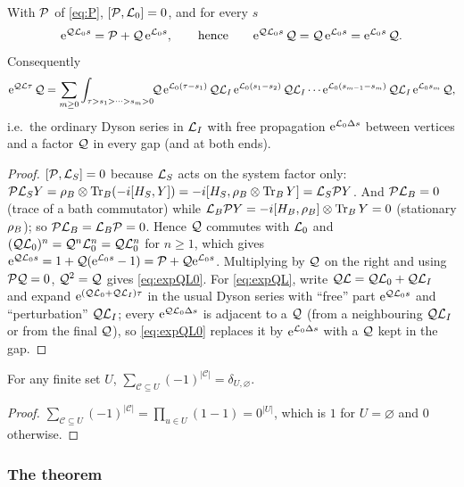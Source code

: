 \begin{lemma}\label{lem:expansion}
With $\mathcal{P}$ of \cref{eq:P}, $[\mathcal{P},\mathcal{L}_0]=0$, and for every $s$
\begin{equation}
  \mathrm{e}^{\mathcal{Q}\mathcal{L}_0s}=\mathcal{P}+\mathcal{Q}\,\mathrm{e}^{\mathcal{L}_0s},\qquad\text{hence}\qquad \mathrm{e}^{\mathcal{Q}\mathcal{L}_0s}\,\mathcal{Q}=\mathcal{Q}\,\mathrm{e}^{\mathcal{L}_0s}=\mathrm{e}^{\mathcal{L}_0s}\,\mathcal{Q} .
  \label{eq:expQL0}
\end{equation}
Consequently
\begin{equation}
  \mathrm{e}^{\mathcal{Q}\mathcal{L}\tau}\,\mathcal{Q}=\sum_{m\ge0}\int_{\tau>s_1>\dots>s_m>0}\!\!
  \mathcal{Q}\,\mathrm{e}^{\mathcal{L}_0(\tau-s_1)}\,\mathcal{Q}\mathcal{L}_I\,\mathrm{e}^{\mathcal{L}_0(s_1-s_2)}\,\mathcal{Q}\mathcal{L}_I\cdots\mathrm{e}^{\mathcal{L}_0(s_{m-1}-s_m)}\,\mathcal{Q}\mathcal{L}_I\,\mathrm{e}^{\mathcal{L}_0s_m}\,\mathcal{Q} ,
  \label{eq:expQL}
\end{equation}
i.e.\ the ordinary Dyson series in $\mathcal{L}_I$ with free propagation $\mathrm{e}^{\mathcal{L}_0\Delta s}$ between vertices and a factor $\mathcal{Q}$ in every gap (and at both ends).
\end{lemma}
\begin{proof}
$[\mathcal{P},\mathcal{L}_S]=0$ because $\mathcal{L}_S$ acts on the system factor only: $\mathcal{P}\mathcal{L}_SY=\rho_{B}\otimes\operatorname{Tr}_B(-i[H_S,Y])=-i[H_S,\rho_{B}\otimes\operatorname{Tr}_BY]=\mathcal{L}_S\mathcal{P} Y$.
And $\mathcal{P}\mathcal{L}_B=0$ (trace of a bath commutator) while $\mathcal{L}_B\mathcal{P} Y=-i[H_B,\rho_{B}]\otimes\operatorname{Tr}_BY=0$ (stationary $\rho_{B}$); so $\mathcal{P}\mathcal{L}_B=\mathcal{L}_B\mathcal{P}=0$.
Hence $\mathcal{Q}$ commutes with $\mathcal{L}_0$ and $(\mathcal{Q}\mathcal{L}_0)^n=\mathcal{Q}^n\mathcal{L}_0^n=\mathcal{Q}\mathcal{L}_0^n$ for $n\ge1$, which gives $\mathrm{e}^{\mathcal{Q}\mathcal{L}_0s}=1+\mathcal{Q}(\mathrm{e}^{\mathcal{L}_0s}-1)=\mathcal{P}+\mathcal{Q}\mathrm{e}^{\mathcal{L}_0s}$.
Multiplying by $\mathcal{Q}$ on the right and using $\mathcal{P}\mathcal{Q}=0$, $\mathcal{Q}^2=\mathcal{Q}$ gives \cref{eq:expQL0}.
For \cref{eq:expQL}, write $\mathcal{Q}\mathcal{L}=\mathcal{Q}\mathcal{L}_0+\mathcal{Q}\mathcal{L}_I$ and expand $\mathrm{e}^{(\mathcal{Q}\mathcal{L}_0+\mathcal{Q}\mathcal{L}_I)\tau}$ in the usual Dyson series with ``free'' part $\mathrm{e}^{\mathcal{Q}\mathcal{L}_0s}$ and ``perturbation'' $\mathcal{Q}\mathcal{L}_I$; every $\mathrm{e}^{\mathcal{Q}\mathcal{L}_0\Delta s}$ is adjacent to a $\mathcal{Q}$ (from a neighbouring $\mathcal{Q}\mathcal{L}_I$ or from the final $\mathcal{Q}$), so \cref{eq:expQL0} replaces it by $\mathrm{e}^{\mathcal{L}_0\Delta s}$ with a $\mathcal{Q}$ kept in the gap.
\end{proof}

\begin{lemma}\label{lem:incl-excl}
For any finite set $U$, $\sum_{\mathcal C\subseteq U}(-1)^{|\mathcal C|}=\delta_{U,\varnothing}$.
\end{lemma}
\begin{proof}
$\sum_{\mathcal C\subseteq U}(-1)^{|\mathcal C|}=\prod_{u\in U}(1-1)=0^{|U|}$, which is $1$ for $U=\varnothing$ and $0$ otherwise.
\end{proof}

\subsubsection{The theorem}

